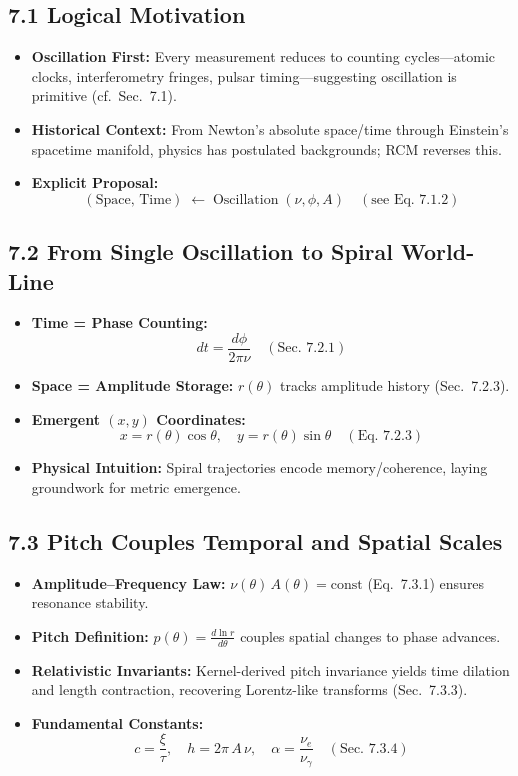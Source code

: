 \subsection{7.1 Logical Motivation}
\begin{itemize}
  \item \textbf{Oscillation First:} Every measurement reduces to counting cycles—atomic clocks, interferometry fringes, pulsar timing—suggesting oscillation is primitive (cf.\ Sec.~7.1).
  \item \textbf{Historical Context:} From Newton’s absolute space/time through Einstein’s spacetime manifold, physics has postulated backgrounds; RCM reverses this.
  \item \textbf{Explicit Proposal:}  
    \[
      (\mathrm{Space,\,Time}) \;\longleftarrow\; \mathrm{Oscillation} \;(\nu,\phi,A)
      \quad(\text{see Eq.~7.1.2})
    \]
\end{itemize}

\subsection{7.2 From Single Oscillation to Spiral World-Line}
\begin{itemize}
  \item \textbf{Time = Phase Counting:} 
    \[
      dt = \frac{d\phi}{2\pi\nu}
      \quad(\text{Sec.~7.2.1})
    \]
  \item \textbf{Space = Amplitude Storage:} \(r(\theta)\) tracks amplitude history (Sec.~7.2.3).
  \item \textbf{Emergent \((x,y)\) Coordinates:}  
    \[
      x = r(\theta)\cos\theta,\quad
      y = r(\theta)\sin\theta
      \quad(\text{Eq.~7.2.3})
    \]
  \item \textbf{Physical Intuition:} Spiral trajectories encode memory/coherence, laying groundwork for metric emergence.
\end{itemize}

\subsection{7.3 Pitch Couples Temporal and Spatial Scales}
\begin{itemize}
  \item \textbf{Amplitude–Frequency Law:}  
    \(\nu(\theta)\,A(\theta)=\mathrm{const}\) (Eq.~7.3.1) ensures resonance stability.
  \item \textbf{Pitch Definition:}  
    \(p(\theta)=\frac{d\ln r}{d\theta}\) couples spatial changes to phase advances.
  \item \textbf{Relativistic Invariants:} Kernel-derived pitch invariance yields time dilation and length contraction, recovering Lorentz-like transforms (Sec.~7.3.3).
  \item \textbf{Fundamental Constants:}  
    \[
      c=\frac{\xi}{\tau},\quad
      h=2\pi\,A\,\nu,\quad
      \alpha=\frac{\nu_e}{\nu_\gamma}
      \quad(\text{Sec.~7.3.4})
    \]
\end{itemize}

